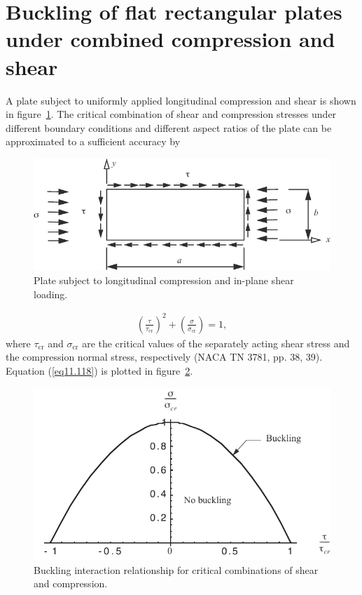 \documentclass{AeroStructure-ERJohnson}
\begin{document}
\clearpage

\section{Buckling of flat rectangular plates under combined compression and shear}\label{sec11.9}

A plate subject to uniformly applied longitudinal compression and shear is shown in figure~\ref{fig11.31}. The critical combination of shear and compression stresses under different boundary conditions and different aspect ratios of the plate can be approximated to a sufficient accuracy by
\begin{figure}[!h]\vspace*{-4pt}
\centerline{\includegraphics{Figure_11-31.pdf}}
\caption{Plate subject to longitudinal compression and in-plane shear loading.} \label{fig11.31}\vspace*{-8pt}
\end{figure}
\begin{align}\label{eq11.118}
\left(\frac{\tau}{\tau_{\textrm{cr}}}\right)^{2}+\left(\frac{\sigma}{\sigma_{\textrm{cr}}}\right)=1,
\end{align}
where $\tau_{\textrm{cr}}$ and $\sigma_{\textrm{cr}}$ are the critical values of the separately acting shear stress and the compression normal stress, respectively (NACA TN 3781, pp. 38, 39). Equation (\ref{eq11.118}) is plotted in figure~\ref{fig11.32}.



\begin{figure}[!h]
\centerline{\includegraphics{Figure_11-32.pdf}}
\caption{Buckling interaction relationship for critical combinations of shear and compression.} \label{fig11.32}\vspace*{-8pt}
\end{figure}
\end{document}
